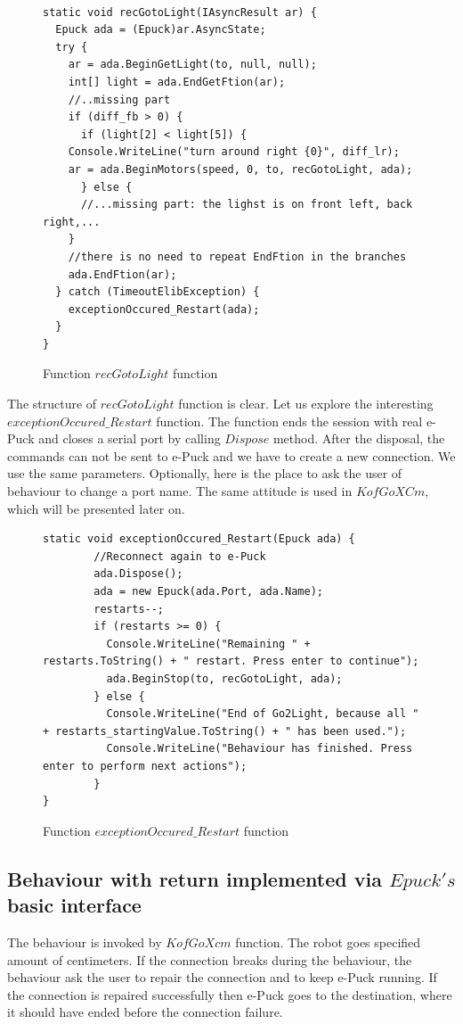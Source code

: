 \documentclass[12pt,notitlepage]{report}
\begin{document}
\begin{figure}[!hbp]
\begin{lstlisting}
	
static void recGotoLight(IAsyncResult ar) {
  Epuck ada = (Epuck)ar.AsyncState;
  try {
    ar = ada.BeginGetLight(to, null, null);
    int[] light = ada.EndGetFtion(ar);
    //..missing part
    if (diff_fb > 0) {
      if (light[2] < light[5]) {
	Console.WriteLine("turn around right {0}", diff_lr);
	ar = ada.BeginMotors(speed, 0, to, recGotoLight, ada);
      } else {
      //...missing part: the lighst is on front left, back right,...
    }
    //there is no need to repeat EndFtion in the branches
    ada.EndFtion(ar);
  } catch (TimeoutElibException) {
    exceptionOccured_Restart(ada);
  }
}
\end{lstlisting}
\caption{Function $recGotoLight$ function} \label{go2light}
\end{figure}
	The structure of $recGotoLight$ function is clear. Let us explore the interesting $exceptionOccured\_Restart$ function.
	The function ends the session with real e-Puck and closes a serial port by calling $Dispose$ method.
	After the disposal, the commands can not be sent to e-Puck and we have to create a new connection. We use the same parameters.
	Optionally, here is the place to ask the user of behaviour to change a port name.
	The same attitude is used in $KofGoXCm$, which will be presented later on.
\begin{figure}[!hbp]
\begin{lstlisting}
static void exceptionOccured_Restart(Epuck ada) {
        //Reconnect again to e-Puck
        ada.Dispose();
        ada = new Epuck(ada.Port, ada.Name);
        restarts--;
        if (restarts >= 0) {
          Console.WriteLine("Remaining " + restarts.ToString() + " restart. Press enter to continue");
          ada.BeginStop(to, recGotoLight, ada);
        } else {
          Console.WriteLine("End of Go2Light, because all " + restarts_startingValue.ToString() + " has been used.");
          Console.WriteLine("Behaviour has finished. Press enter to perform next actions");
        }
}
\end{lstlisting}
\caption{Function $exceptionOccured\_Restart$ function} \label{restart}
\end{figure}

\subsection{Behaviour with return implemented via $Epuck's$ basic interface}\label{sec:kofgoxcm}
	The behaviour is invoked by $KofGoXcm$ function. 
	The robot goes specified amount of centimeters. 
	If the connection breaks during the behaviour, 
	the behaviour ask the user to repair the connection and to keep e-Puck running. 
	If the connection is repaired successfully then e-Puck goes to the destination, 
	where it should have ended before the connection failure.
\end{document}
